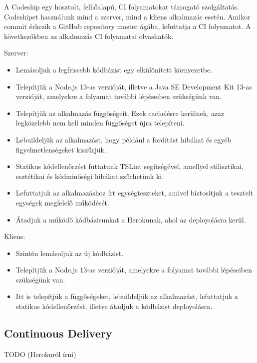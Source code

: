 \documentclass{elteikthesis}
\begin{document}
				A Codeship egy hosztolt, felhőalapú, CI folyamatokat támogató szolgáltatás. Codeshipet használunk mind a szerver, mind a kliens alkalmazás esetén. Amikor commit érkezik a GitHub repository master ágába, lefuttatja a CI folyamatot. A következőkben az alkalmazás CI folyamatai olvashatók.

				Szerver:
				\begin{itemize}
					\setlength\itemsep{-0.5em}
					\item Lemásoljuk a legfrissebb kódbázist egy elkülönített környezetbe.
					\item Telepítjük a Node.js 13-as verzióját, illetve a Java SE Development Kit 13-as verzióját, amelyekre a folyamat további lépéseiben szükségünk van.
					\item Telepítjük az alkalmazás függőségeit. Ezek cachelésre kerülnek, azaz legközelebb nem kell minden függőséget újra telepíteni.
					\item Lebuildeljük az alkalmazást, hogy például a fordítást hibákat és egyéb figyelmetlenségeket kiszűrjük.
					\item Statikus kódellenőrzést futtatunk TSLint segítségével, amellyel stilisztikai, esztétikai és kódminőségi hibákat szűrhetünk ki.
					\item Lefuttatjuk az alkalmazáshoz írt egységteszteket, amivel biztosítjuk a tesztelt egységek megfelelő működését.
					\item Átadjuk a működő kódbázisunkat a Herokunak, ahol az deployolásra kerül.
				\end{itemize}

				Kliens:
				\begin{itemize}
					\setlength\itemsep{-0.5em}
					\item Szintén lemásoljuk az új kódbázist.
					\item Telepítjük a Node.js 13-as verzióját, amelyekre a folyamat további lépéseiben szükségünk van.
					\item Itt is telepítjük a függőségeket, lebuildeljük az alkalmazást, lefuttatjuk a statikus kódellenőrzést, illetve átadjuk a kódbázist deployolásra.
				\end{itemize}
			
			\subsection{Continuous Delivery}
			TODO (Herokuról írni)
\end{document}
